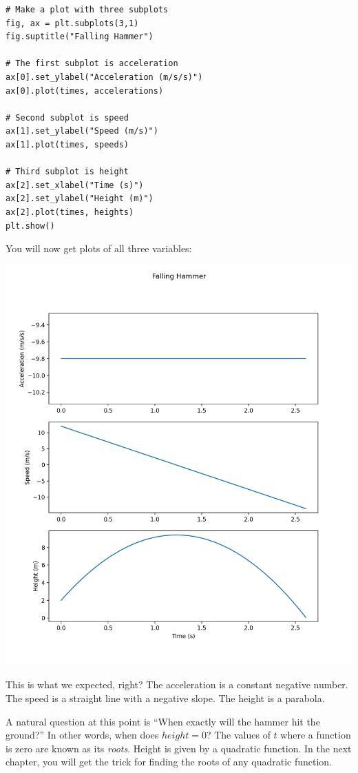 \begin{Verbatim}
# Make a plot with three subplots
fig, ax = plt.subplots(3,1)
fig.suptitle("Falling Hammer")

# The first subplot is acceleration
ax[0].set_ylabel("Acceleration (m/s/s)")
ax[0].plot(times, accelerations)

# Second subplot is speed
ax[1].set_ylabel("Speed (m/s)")
ax[1].plot(times, speeds)

# Third subplot is height
ax[2].set_xlabel("Time (s)")
ax[2].set_ylabel("Height (m)")
ax[2].plot(times, heights)
plt.show()
\end{Verbatim}

You will now get plots of all three variables:

\includegraphics[width=0.8\linewidth]{stackedplot.png}

This is what we expected, right? The acceleration is a constant negative 
number. The speed is a straight line with a negative slope. The height is a 
parabola.

A natural question at this point is ``When exactly will the hammer hit the
ground?''  In other words, when does $height = 0$? The values of $t$ where a 
function is zero are known as its \textit{roots}. Height is given by a quadratic 
function. In the next chapter, you will get the trick for finding the roots of 
any quadratic function.
